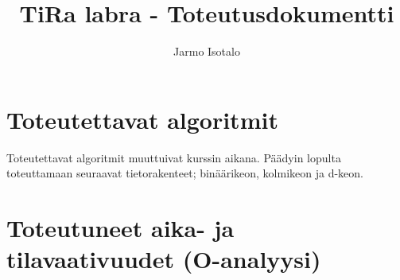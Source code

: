\documentclass[a4paper,12pt]{article}
\begin{document}
\title{TiRa labra - Toteutusdokumentti} 
\author{Jarmo Isotalo}
\maketitle

\section{Toteutettavat algoritmit}
Toteutettavat algoritmit muuttuivat kurssin aikana. Päädyin lopulta toteuttamaan seuraavat tietorakenteet; binäärikeon, kolmikeon ja d-keon.

\section{Toteutuneet aika- ja tilavaativuudet (O-analyysi)}
\end{document}
